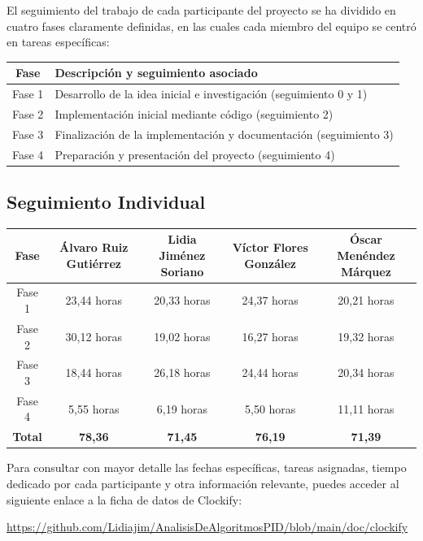 \documentclass[a4paper]{article}
\begin{document}
El seguimiento del trabajo de cada participante del proyecto se ha dividido en cuatro fases claramente definidas, en las cuales cada miembro del equipo se centró en tareas específicas:
\begin{center}
  \begin{tabular}{|c|l|}
  \hline
  \textbf{Fase} & \textbf{Descripción y seguimiento asociado} \\
  \hline
  Fase 1 & Desarrollo de la idea inicial e investigación (seguimiento 0 y 1) \\
  Fase 2 & Implementación inicial mediante código (seguimiento 2) \\
  Fase 3 & Finalización de la implementación y documentación (seguimiento 3) \\
  Fase 4 & Preparación y presentación del proyecto (seguimiento 4) \\
  \hline
  \end{tabular}
  \end{center}

  \subsection*{Seguimiento Individual}

  \begin{center}
  \begin{tabular}{|c|c|c|c|c|}
  \hline
  Fase & Álvaro Ruiz Gutiérrez & Lidia Jiménez Soriano & Víctor Flores González & Óscar Menéndez Márquez \\
  \hline
  Fase 1 & 23,44 horas & 20,33 horas& 24,37 horas& 20,21 horas\\
  Fase 2 & 30,12 horas & 19,02 horas& 16,27 horas& 19,32 horas\\
  Fase 3 & 18,44 horas& 26,18 horas & 24,44 horas& 20,34 horas\\
  Fase 4 & 5,55 horas& 6,19 horas & 5,50 horas& 11,11 horas\\
  \hline
  \textbf{Total} & \textbf{78,36} & \textbf{71,45} & \textbf{76,19} & \textbf{71,39} \\
  \hline
  \end{tabular}
  \end{center}
  

Para consultar con mayor detalle las fechas específicas, tareas asignadas, tiempo dedicado por cada participante 
y otra información relevante, puedes acceder al siguiente enlace a la ficha de datos de Clockify: 


\begin{center}
    \url{https://github.com/Lidiajim/AnalisisDeAlgoritmosPID/blob/main/doc/clockify}
\end{center}
\end{document}
